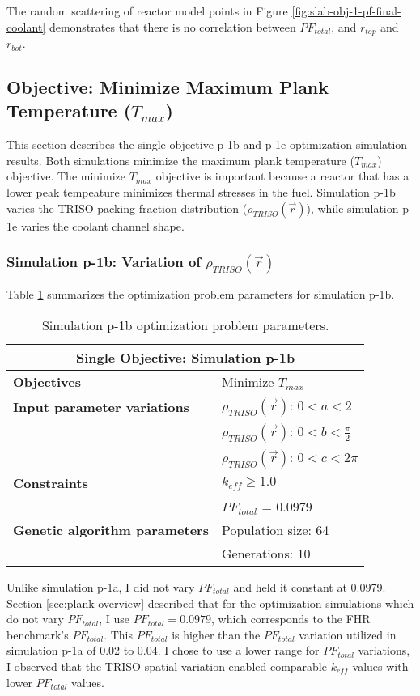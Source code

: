 The random scattering of reactor model points in Figure 
\ref{fig:slab-obj-1-pf-final-coolant} demonstrates that there is no correlation 
between $PF_{total}$, and $r_{top}$ and $r_{bot}$.

\subsection{Objective: Minimize Maximum Plank Temperature ($T_{max}$)}
\label{sec:plank-1-obj-temp}
This section describes the single-objective p-1b and p-1e optimization simulation
results. 
Both simulations minimize the maximum plank temperature ($T_{max}$) objective. 
The minimize $T_{max}$ objective is important because a reactor that has a lower 
peak tempeature minimizes thermal stresses in the fuel. 
Simulation p-1b varies the \gls{TRISO} packing fraction distribution 
($\rho_{TRISO}(\vec{r})$), while simulation p-1e varies the coolant channel shape. 

\subsubsection{Simulation p-1b: Variation of $\rho_{TRISO}(\vec{r})$}
Table \ref{tab:simulationp1b} summarizes the optimization problem parameters for 
simulation p-1b.  
\begin{table}[htbp!]
    \centering
    \onehalfspacing
    \caption{Simulation p-1b optimization problem parameters.}
	\label{tab:simulationp1b}
    \footnotesize
    \begin{tabular}{l|p{4cm}}
    \hline 
    \multicolumn{2}{c}{\textbf{Single Objective: Simulation p-1b}} \\
    \hline 
    \textbf{Objectives} & Minimize $T_{max}$ \\
    \hline 
    \textbf{Input parameter variations}     
    & $\rho_{TRISO}(\vec{r})$: $0<a<2$ \\
    & $\rho_{TRISO}(\vec{r})$: $0<b<\frac{\pi}{2}$ \\
    & $\rho_{TRISO}(\vec{r})$: $0<c<2\pi$ \\
    \hline
    \textbf{Constraints} & $k_{eff} \geq 1.0$\\ 
    & $PF_{total}$ = 0.0979\\
    \hline 
    \textbf{Genetic algorithm parameters} & Population size: 64 \\
    & Generations: 10 \\
    \hline
    \end{tabular}
\end{table}
Unlike simulation p-1a, I did not vary $PF_{total}$ and held it constant at 0.0979. 
Section \ref{sec:plank-overview} described that for the optimization simulations which 
do not vary $PF_{total}$, I use $PF_{total} = 0.0979$, which corresponds to the 
\gls{FHR} benchmark's $PF_{total}$.  
This $PF_{total}$ is higher than the $PF_{total}$ variation utilized in simulation p-1a 
of 0.02 to 0.04. 
I chose to use a lower range for $PF_{total}$ variations, I observed that the TRISO 
spatial variation enabled comparable $k_{eff}$ values with lower $PF_{total}$ values. 

